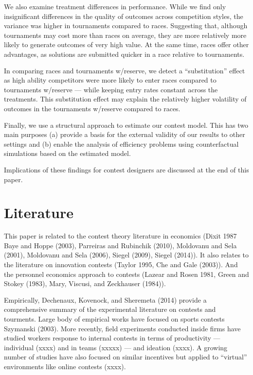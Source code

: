 \documentclass[10pt, titlepage]{article}
\begin{document}
We also examine treatment differences in performance. While we find only
insignificant differences in the quality of outcomes across competition
styles, the variance was higher in tournaments compared to races.
Suggesting that, although tournaments may cost more than races on
average, they are more relatively more likely to generate outcomes of
very high value. At the same time, races offer other advantages, as
solutions are submitted quicker in a race relative to tournaments.

In comparing races and tournaments w/reserve, we detect a
``substitution'' effect as high ability competitors were more likely to
enter races compared to tournaments w/reserve --- while keeping entry
rates constant across the treatments. This substitution effect may
explain the relatively higher volatility of outcomes in the tournaments
w/reserve compared to races.

Finally, we use a structural approach to estimate our contest model.
This has two main purposes (a) provide a basis for the external validity
of our results to other settings and (b) enable the analysis of
efficiency problems using counterfactual simulations based on the
estimated model.

Implications of these findings for contest designers are discussed at
the end of this paper.

\section{Literature}\label{literature}

This paper is related to the contest theory literature in economics
(Dixit 1987 Baye and Hoppe (2003), Parreiras and Rubinchik (2010),
Moldovanu and Sela (2001), Moldovanu and Sela (2006), Siegel (2009),
Siegel (2014)). It also relates to the literature on innovation contests
(Taylor 1995, Che and Gale (2003)). And the personnel economics approach
to contests (Lazear and Rosen 1981, Green and Stokey (1983), Mary,
Viscusi, and Zeckhauser (1984)).

Empirically, Dechenaux, Kovenock, and Sheremeta (2014) provide a
comprehensive summary of the experimental literature on contests and
tourments. Large body of empirical works have focused on sports contests
Szymanski (2003). More recently, field experiments conducted inside
firms have studied workers response to internal contests in terms of
productivity --- individual (xxxx) and in teams (xxxxx) --- and ideation
(xxxx). A growing number of studies have also focused on similar
incentives but applied to ``virtual'' environments like online contests
(xxxx).
\end{document}
